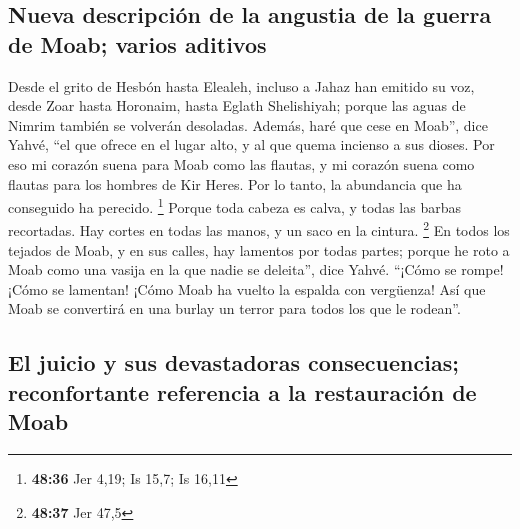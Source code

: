 \begin{paracol}{2}
\hypertarget{nueva-descripciuxf3n-de-la-angustia-de-la-guerra-de-moab-varios-aditivos}{%
\subsection{Nueva descripción de la angustia de la guerra de Moab;
varios
aditivos}\label{nueva-descripciuxf3n-de-la-angustia-de-la-guerra-de-moab-varios-aditivos}}

 Desde el grito de Hesbón hasta Elealeh, incluso a Jahaz
han emitido su voz, desde Zoar hasta Horonaim, hasta Eglath Shelishiyah;
porque las aguas de Nimrim también se volverán desoladas.
 Además, haré que cese en Moab'', dice Yahvé, ``el que
ofrece en el lugar alto, y al que quema incienso a sus dioses.
 Por eso mi corazón suena para Moab como las flautas, y
mi corazón suena como flautas para los hombres de Kir Heres. Por lo
tanto, la abundancia que ha conseguido ha perecido. \footnote{\textbf{48:36}
  Jer 4,19; Is 15,7; Is 16,11}  Porque toda cabeza es
calva, y todas las barbas recortadas. Hay cortes en todas las manos, y
un saco en la cintura. \footnote{\textbf{48:37} Jer 47,5}
 En todos los tejados de Moab, y en sus calles, hay
lamentos por todas partes; porque he roto a Moab como una vasija en la
que nadie se deleita'', dice Yahvé.  ``¡Cómo se rompe!
¡Cómo se lamentan! ¡Cómo Moab ha vuelto la espalda con vergüenza! Así
que Moab se convertirá en una burlay un terror para todos los que le
rodean''.

\hypertarget{el-juicio-y-sus-devastadoras-consecuencias-reconfortante-referencia-a-la-restauraciuxf3n-de-moab}{%
\subsection{El juicio y sus devastadoras consecuencias; reconfortante
referencia a la restauración de
Moab}\label{el-juicio-y-sus-devastadoras-consecuencias-reconfortante-referencia-a-la-restauraciuxf3n-de-moab}}


\end{paracol}
